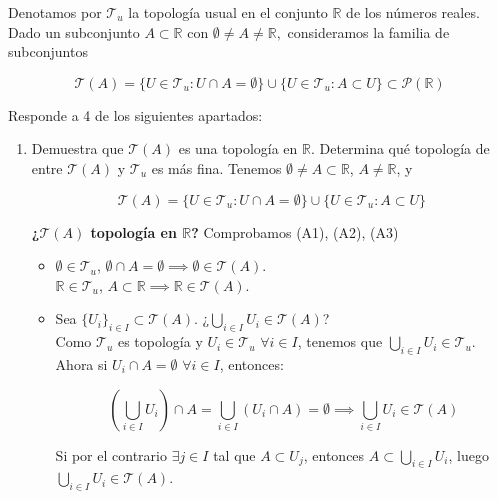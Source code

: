 \documentclass[12pt]{article}
\begin{document}
    \begin{ejercicio}[2 puntos] Denotamos por $\mathcal{T}_{u}$ la topología usual en el conjunto $\mathbb{R}$ de los números reales.
        Dado un subconjunto $A\subset\mathbb{R}$ con $\emptyset\ne A\ne\mathbb{R},$ consideramos la familia de subconjuntos
        
        $$\mathcal{T}(A)=\{U\in\mathcal{T}_{u}:U\cap A=\emptyset\}\cup\{U\in\mathcal{T}_{u}:A\subset U\}\subset\mathcal{P}(\mathbb{R})$$
        
        Responde a 4 de los siguientes apartados:
        \begin{enumerate}[label=(\alph*)]
            \item Demuestra que $\mathcal{T}(A)$ es una topología en $\mathbb{R}$. Determina qué topología de entre $\mathcal{T}(A)$ y $\mathcal{T}_{u}$ es más fina.
                Tenemos $\emptyset\ne A\subset \mathbb{R}$, $A\ne \mathbb{R}$, y
                
                $$\mathcal{T}(A) = \{U \in \mathcal{T}_u : U \cap A = \emptyset\} \cup \{U \in \mathcal{T}_u : A \subset U\}$$
    
                \textbf{¿$\mathcal{T}(A)$ topología en $\mathbb{R}$?} Comprobamos (A1), (A2), (A3)
                
                \begin{itemize}[leftmargin=*]
                    \item[\textbf{(A1)}] $\emptyset \in \mathcal{T}_u$, $\emptyset \cap A = \emptyset \implies \emptyset \in \mathcal{T}(A)$.\\
                    $\mathbb{R} \in \mathcal{T}_u$, $A \subset \mathbb{R} \implies \mathbb{R} \in \mathcal{T}(A)$.
                
                    \item[\textbf{(A2)}] Sea $\{U_i\}_{i \in I} \subset \mathcal{T}(A)$. ¿$\bigcup_{i \in I} U_i \in \mathcal{T}(A)$?\\
                    Como $\mathcal{T}_u$ es topología y $U_i \in \mathcal{T}_u$ $\forall i \in I$, tenemos que $\bigcup_{i \in I} U_i \in \mathcal{T}_u$.\\
                    Ahora si $U_i \cap A = \emptyset$ $\forall i \in I$, entonces:
                    
                    $$\left(\bigcup_{i \in I} U_i\right) \cap A = \bigcup_{i \in I} (U_i \cap A) = \emptyset \implies \bigcup_{i \in I} U_i \in \mathcal{T}(A)$$
                    
                    Si por el contrario $\exists j \in I$ tal que $A \subset U_j$, entonces $A \subset \bigcup_{i \in I} U_i$, luego $\bigcup_{i \in I} U_i \in \mathcal{T}(A)$.
                

\end{itemize}
\end{enumerate}
\end{ejercicio}
\end{document}
